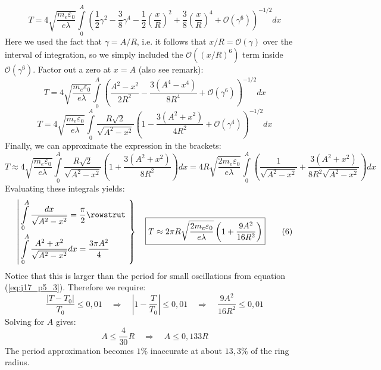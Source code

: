\begin{description}[leftmargin=!, labelwidth=\widthof{$\bullet$}]
\begin{equation*}
		T = 
		4 \sqrt{\frac{m_e \varepsilon_0}{e \lambda}}
		\int\limits_{0}^{A}
		\left(
		\frac{1}{2} \gamma^2 - \frac{3}{8} \gamma^4 - \frac{1}{2} \left(\frac{x}{R}\right)^2
		+
		\frac{3}{8} \left(\frac{x}{R}\right)^4
		+
		\mathcal{O}(\gamma^6)
		\right)^{-1/2}
		dx
		\tag{$**$}
		\label{eq:j17_p5_mock2}
	\end{equation*}
	Here we used the fact that $\gamma = A/R$, i.e. it follows that $x / R = \mathcal{O}(\gamma)$ over the interval of integration, so we simply included the $\mathcal{O}((x/R)^6)$ term inside $\mathcal{O}(\gamma^6)$. Factor out a zero at $x = A$ (also see remark):
	\begin{equation*}
		T
		=
		4 \sqrt{\frac{m_e \varepsilon_0}{e \lambda}}
		\int\limits_{0}^{A}
		\left(
		\frac{A^2 - x^2}{2R^2}
		-
		\frac{3(A^4 - x^4)}{8R^4}
		+
		\mathcal{O}(\gamma^6)
		\right)^{-1/2} dx
	\end{equation*}
	\begin{equation*}
		T
		=
		4 \sqrt{\frac{m_e \varepsilon_0}{e \lambda}}
		\int\limits_{0}^{A}
		\frac{R \sqrt{2}}{\sqrt{A^2 - x^2}}
		\left(
		1
		-
		\frac{3(A^2 + x^2)}{4R^2}
		+
		\mathcal{O}(\gamma^4)
		\right)^{-1/2} dx
	\end{equation*}
	Finally, we can approximate the expression in the brackets:
	\begin{equation*}
		T
		\approx
		4 \sqrt{\frac{m_e \varepsilon_0}{e \lambda}}
		\int\limits_{0}^{A}
		\frac{R \sqrt{2}}{\sqrt{A^2 - x^2}}
		\left(
		1
		+
		\frac{3(A^2 + x^2)}{8R^2}
		\right) 
		dx
		=
		4R \sqrt{\frac{2m_e \varepsilon_0}{e \lambda}}
		\int\limits_{0}^{A}
		\left(
		\frac{1}{\sqrt{A^2 - x^2}}
		+
		\frac{3 (A^2 + x^2)}{8R^2 \sqrt{A^2 - x^2}}
		\right)
		dx
	\end{equation*}
	Evaluating these integrals yields:
	\begin{equation*}
		\left|
		\begin{aligned}
			& \int\limits_{0}^{A} \frac{dx}{\sqrt{A^2 - x^2}} = \frac{\pi}{2}
			\rowstrut
			\\
			& \int\limits_{0}^{A} \frac{A^2 + x^2}{\sqrt{A^2 - x^2}} dx
			=
			\frac{3 \pi A^2}{4}
		\end{aligned}
		\,\,
		\right\}
		\quad
		\boxed{
		T
		\approx
		2 \pi R \sqrt{\frac{2 m_e \varepsilon_0}{e \lambda}}
		\left(1 + \frac{9A^2}{16R^2}\right)
		}
		\tag{$6$}
		\label{eq:j17_p5_6}
	\end{equation*}
	Notice that this is larger than the period for small oscillations from equation (\ref{eq:j17_p5_3}). Therefore we require:
	\begin{equation*}
		\frac{
		|T - T_0|
		}{T_0} \leq 0{,}01
		\quad\Rightarrow\quad
		\left|
		1 - \frac{T}{T_0}
		\right| \leq 0{,}01
		\quad\Rightarrow\quad
		\frac{9A^2}{16R^2} \leq 0{,}01
	\end{equation*}
	Solving for $A$ gives:
	\begin{equation*}
		\boxed{A \leq \frac{4}{30} R}
		\quad\Rightarrow\quad
		\boxed{A \leq 0{,}133 R}
		\tag{$7$}
		\label{eq:j17_p5_7}
	\end{equation*}
	The period approximation becomes $1\%$ inaccurate at about $13{,}3\%$ of the ring radius.
\end{description}
